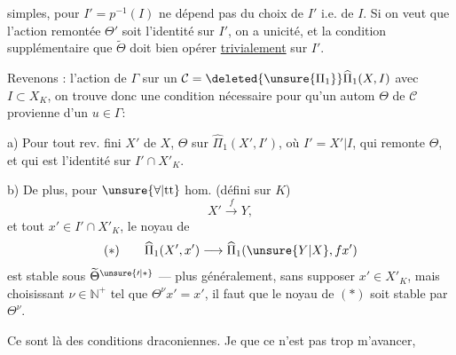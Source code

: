  simples,  pour $I'=p^{-1}(I)$ ne dépend pas du choix de $I'$ i.e. de $I$. Si on veut que l'action remontée $\Theta'$ soit l'identité sur $I'$, on a unicité, et la condition supplémentaire que $\widetilde{\Theta}$ doit bien opérer \uline{trivialement} sur $I'$.

Revenons : l'action de $\Gamma$  sur un $\mathcal{C}=\deleted{\unsure{\Pi_1}}\widehat{\Pi}_1(X,I)$ avec $I\subset X_K$, on trouve donc une condition nécessaire pour qu'un autom $\Theta$ de $\mathcal{C}$  provienne d'un $u\in\Gamma$:

a) Pour tout rev.  fini $X'$ de $X$,     $\Theta$ sur $\widehat{\Pi}_1(X',I')$, où $I'=X'|I$, qui remonte $\Theta$, et qui est l'identité sur $I'\cap X'_K$.

b) De plus, pour $\unsure{\forall|\text{tt}}$ hom. (défini sur $K$)
\[
X'\xrightarrow{f}Y,
\]
et tout $x'\in I'\cap X'_K$, le noyau de
\[
(*)\qquad\widehat{\Pi}_1(X',x')\longrightarrow\widehat{\Pi}_1(\unsure{Y|X},f x')
\]
est stable sous $\widetilde{\Theta}^{\unsure{\prime|*}}$  --- plus généralement, sans supposer $x'\in X'_K$, mais choisissant $\nu\in\mathbb{N}^{+}$ tel que $\Theta^\nu x'=x'$, il faut que \deleted{$\Theta$} le noyau de $(*)$ soit stable par $\Theta^\nu$.

Ce sont là des conditions draconiennes. Je  que ce n'est pas trop m'avancer,
